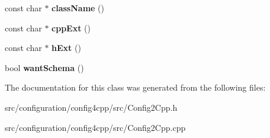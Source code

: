 \begin{DoxyCompactItemize}
\item 
\hypertarget{classCONFIG4CPP__NAMESPACE_1_1Config2Cpp_a28836cb450289ac0c37965ef581fb98c}{const char $\ast$ {\bfseries class\-Name} ()}\label{classCONFIG4CPP__NAMESPACE_1_1Config2Cpp_a28836cb450289ac0c37965ef581fb98c}

\item 
\hypertarget{classCONFIG4CPP__NAMESPACE_1_1Config2Cpp_a9a569781f751ec8cbf2dc58472143a73}{const char $\ast$ {\bfseries cpp\-Ext} ()}\label{classCONFIG4CPP__NAMESPACE_1_1Config2Cpp_a9a569781f751ec8cbf2dc58472143a73}

\item 
\hypertarget{classCONFIG4CPP__NAMESPACE_1_1Config2Cpp_adb9c986ec921522aa48a1b42ec04b675}{const char $\ast$ {\bfseries h\-Ext} ()}\label{classCONFIG4CPP__NAMESPACE_1_1Config2Cpp_adb9c986ec921522aa48a1b42ec04b675}

\item 
\hypertarget{classCONFIG4CPP__NAMESPACE_1_1Config2Cpp_aac349fdbbf8a879a30c7a29575d65cfc}{bool {\bfseries want\-Schema} ()}\label{classCONFIG4CPP__NAMESPACE_1_1Config2Cpp_aac349fdbbf8a879a30c7a29575d65cfc}

\end{DoxyCompactItemize}


The documentation for this class was generated from the following files\-:\begin{DoxyCompactItemize}
\item 
src/configuration/config4cpp/src/Config2\-Cpp.\-h\item 
src/configuration/config4cpp/src/Config2\-Cpp.\-cpp\end{DoxyCompactItemize}
